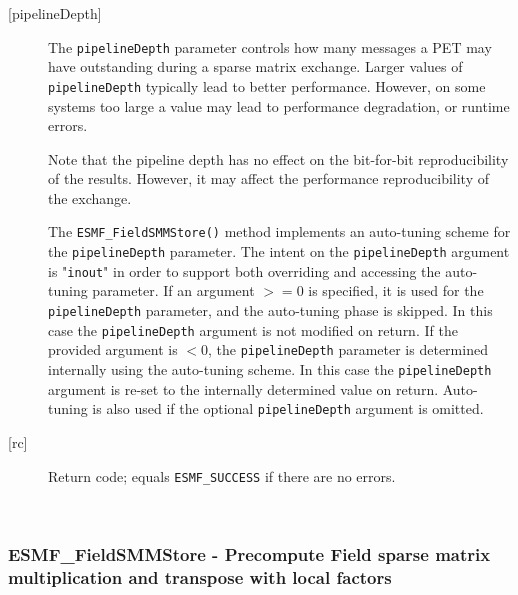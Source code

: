 \begin{description}
     \item [{[pipelineDepth]}]
       The {\tt pipelineDepth} parameter controls how many messages a PET
       may have outstanding during a sparse matrix exchange. Larger values
       of {\tt pipelineDepth} typically lead to better performance. However,
       on some systems too large a value may lead to performance degradation,
       or runtime errors.
  
       Note that the pipeline depth has no effect on the bit-for-bit
       reproducibility of the results. However, it may affect the performance
       reproducibility of the exchange.
  
       The {\tt ESMF\_FieldSMMStore()} method implements an auto-tuning scheme
       for the {\tt pipelineDepth} parameter. The intent on the
       {\tt pipelineDepth} argument is "{\tt inout}" in order to
       support both overriding and accessing the auto-tuning parameter.
       If an argument $>= 0$ is specified, it is used for the
       {\tt pipelineDepth} parameter, and the auto-tuning phase is skipped.
       In this case the {\tt pipelineDepth} argument is not modified on
       return. If the provided argument is $< 0$, the {\tt pipelineDepth}
       parameter is determined internally using the auto-tuning scheme. In this
       case the {\tt pipelineDepth} argument is re-set to the internally
       determined value on return. Auto-tuning is also used if the optional
       {\tt pipelineDepth} argument is omitted.
  
     \item [{[rc]}]  
       Return code; equals {\tt ESMF\_SUCCESS} if there are no errors.
  
   \end{description} 
    
 
\mbox{}\hrulefill\ 
 
\subsubsection [ESMF\_FieldSMMStore] {ESMF\_FieldSMMStore - Precompute Field sparse matrix multiplication and transpose with local factors}


